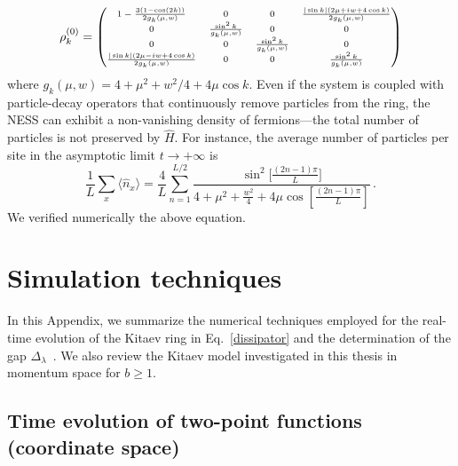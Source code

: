 \begin{equation}
\scriptsize{
\rho^{(0)}_k=
\begin{pmatrix}
    1-\frac{3(1-\cos(2k))}{2g_k(\mu,w)} & 0 &0&
    \frac{|\sin k|(2\mu+i w+4\cos k)}{2g_k(\mu,w)}\\
    0 & \frac{\sin^2k}{g_k(\mu,w)} &0&0\\
    0 & 0&\frac{\sin^2k}{g_k(\mu,w)} &0\\
        \frac{|\sin k|(2\mu-i w+4\cos k)}{2g_k(\mu,w)} & 0&0&\frac{\sin^2k}{g_k(\mu,w)}
\end{pmatrix}
}
\end{equation}
where $g_k(\mu,w)=4+\mu^2 + w^2/4 + 4\mu \cos 
k$. Even if the system is coupled with particle-decay operators that continuously remove particles from the ring, the NESS can exhibit a non-vanishing density of fermions—the total number of particles is not preserved by $\hat{H}$. For instance, the average number of particles per site in the asymptotic limit $t\to+\infty$ is
\begin{equation}
    \frac{1}{L}\sum_x\langle\hat{n}_x\rangle=\frac{4}{L}\sum_{n=1}^{L/2}\frac{\sin^2\big[\frac{(2n-1)\pi}{L}\big]}{4+\mu^2+\frac{w^2}{4}+4\mu\cos[\frac{(2n-1)\pi}{L}]}\,.
\end{equation}
We verified numerically the above equation. 

\section{Simulation techniques}
\label{sec_app_simulation}
In this Appendix, we summarize the numerical techniques employed for the real-time evolution of the Kitaev ring in Eq.~\eqref{dissipator} and the determination of the gap $\Delta_\lambda$~\cite{P-2008-thirdquantization}. We also review the Kitaev model investigated in this thesis in momentum space for $b\geq1$.

\subsection{Time evolution of two-point functions (coordinate space)}
\label{sec_app_coordinate_space}

